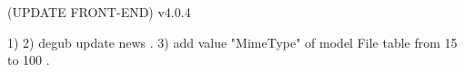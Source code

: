 (UPDATE FRONT-END) v4.0.4

1) 
2) degub update news .
3) add value "MimeType" of model File table from 15 to 100 .